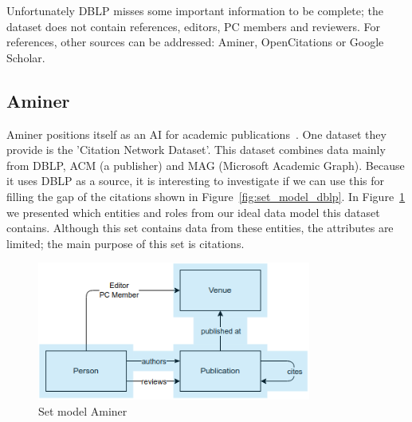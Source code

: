 \documentclass{ou-report}
\newcommand{\outline}[1]{{\color{blue} #1}}
\begin{document}

Unfortunately DBLP misses some important information to be complete; the dataset
does not contain references, editors, PC members and reviewers. For 
references, other sources can be addressed: Aminer, OpenCitations or Google 
Scholar.

\subsection{Aminer}
Aminer positions itself as an AI for academic publications~\cite{Tang:08KDD}. 
One dataset they provide is the 
'Citation Network Dataset'. This dataset combines data mainly from DBLP, ACM (a 
publisher) and MAG (Microsoft Academic Graph). Because it uses DBLP as a 
source, it is interesting to 
investigate if we can use this for filling the gap of the citations shown in 
Figure~\ref{fig:set_model_dblp}.
In Figure~\ref{fig:set_model_aminer} we presented which entities and roles
from our ideal data model this dataset contains. Although this set contains data
from these entities, the attributes are limited; the main purpose of this set is
citations.
\begin{figure}[H]
\includegraphics[width=9cm]{images/set_model_aminer.png}
\centering
\caption{Set model Aminer}
\label{fig:set_model_aminer}
\end{figure}
\end{document}
